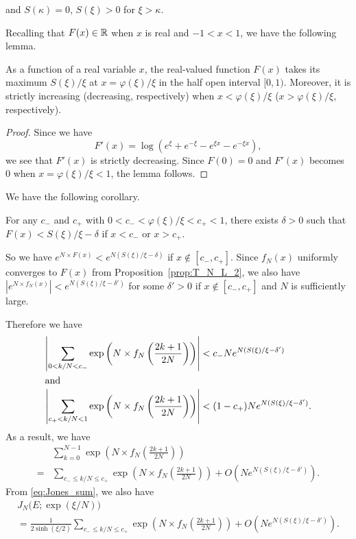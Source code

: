 and $S(\kappa)=0$, $S(\xi)>0$ for $\xi>\kappa$.
\par
Recalling that $F(x)\in\mathbb{R}$ when $x$ is real and $-1<x<1$, we have the following lemma.
\begin{lem}
As a function of a real variable $x$, the real-valued function $F(x)$ takes its maximum $S(\xi)/\xi$ at $x=\varphi(\xi)/\xi$ in the half open interval $[0,1)$.
Moreover, it is strictly increasing {\rm(}decreasing, respectively{\rm)} when $x<\varphi(\xi)/\xi$ {\rm(}$x>\varphi(\xi)/\xi$, respectively{\rm)}.
\end{lem}
\begin{proof}
Since we have
\begin{equation*}
  F'(x)
  =
  \log(e^{\xi}+e^{-\xi}-e^{\xi x}-e^{-\xi x}),
\end{equation*}
we see that $F'(x)$ is strictly decreasing.
Since $F(0)=0$ and $F'(x)$ becomes $0$ when $x=\varphi(\xi)/\xi<1$, the lemma follows.
\end{proof}
We have the following corollary.
\begin{cor}
For any $c_{-}$ and $c_{+}$ with $0<c_{-}<\varphi(\xi)/\xi<c_{+}<1$, there exists $\delta>0$ such that $F(x)<S(\xi)/\xi-\delta$ if $x<c_{-}$ or $x>c_{+}$.
\end{cor}
So we have $e^{N\times F(x)}<e^{N(S(\xi)/\xi-\delta)}$ if $x\not\in[c_{-},c_{+}]$.
Since $f_N(x)$ uniformly converges to $F(x)$ from Proposition~\ref{prop:T_N_L_2}, we also have $\left|e^{N\times f_N(x)}\right|<e^{N(S(\xi)/\xi-\delta')}$ for some $\delta'>0$ if $x\not\in[c_{-},c_{+}]$ and $N$ is sufficiently large.
\par
Therefore we have
\begin{align*}
  \left|\sum_{0<k/N<c_{-}}\exp\left(N\times f_N\left(\frac{2k+1}{2N}\right)\right)\right|
  &<
  c_{-}Ne^{N(S(\xi)/\xi-\delta')}
  \\
  \intertext{and}
  \left|\sum_{c_{+}<k/N<1}\exp\left(N\times f_N\left(\frac{2k+1}{2N}\right)\right)\right|
  &<
  (1-c_{+})Ne^{N(S(\xi)/\xi-\delta')}.
\end{align*}
As a result, we have
\begin{equation*}
\begin{split}
  &\sum_{k=0}^{N-1}\exp\left(N\times f_N\left(\frac{2k+1}{2N}\right)\right)
  \\
  =&
  \sum_{c_{-}\le k/N\le c_{+}}\exp\left(N\times f_N\left(\frac{2k+1}{2N}\right)\right)
  +
  O\left(Ne^{N(S(\xi)/\xi-\delta')}\right).
\end{split}
\end{equation*}
From \eqref{eq:Jones_sum}, we also have
\begin{multline}\label{eq:J_summation}
  J_N\bigl(E;\exp(\xi/N)\bigr)
  \\
  =
  \frac{1}{2\sinh(\xi/2)}
  \sum_{c_{-}\le k/N\le c_{+}}\exp\left(N\times f_N\left(\frac{2k+1}{2N}\right)\right)
  +
  O\left(Ne^{N(S(\xi)/\xi-\delta')}\right).
\end{multline}